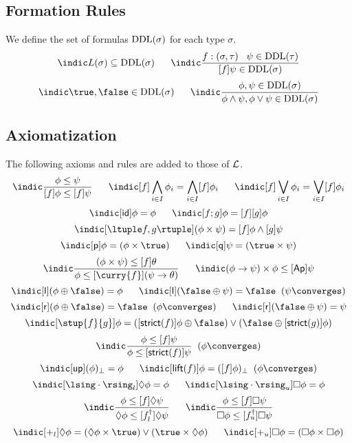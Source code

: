 \subsection*{Formation Rules}
We define the set of formulas ${\rm DDL}(\sigma )$ for each type $\sigma$.
\[ \indic L(\sigma ) \subseteq {\rm DDL}(\sigma ) \;\;\;\;\;\;
\indic \frac{f : (\sigma , \tau ) \;\;\; \psi \in {\rm DDL}(\tau )}{[f]\psi \in {\rm DDL}(\sigma )} \]
\[ \indic \true , \false \in {\rm DDL}(\sigma ) \;\;\;\;\;\;
\indic \frac{\phi , \psi \in {\rm DDL}(\sigma )}{\phi \wedge \psi , \phi \vee \psi \in {\rm DDL}(\sigma )} \]
\subsection*{Axiomatization}
The following axioms and rules are added to those of $\cal L$.
\[ \indic \frac{\phi \leq \psi}{[f]\phi \leq [f]\psi} \;\;\;\;\;\;
   \indic [f]\bigwedge_{i \in I} \phi_{i} = \bigwedge_{i \in I} [f] \phi_{i} \;\;\;\;\;\;
   \indic [f]\bigvee_{i \in I} \phi_{i} = \bigvee_{i \in I} [f] \phi_{i} \]
\[ \indic [{\sf id}]\phi = \phi \;\;\;\;\;\; \indic [f ; g] \phi = [f][g]\phi \]
\[ \indic [\ltuple f, g \rtuple ] (\phi \times \psi ) = [f]\phi \wedge [g]\psi \]
\[ \indic [{\sf p}]\phi = (\phi \times \true ) \;\;\;\;\;\;
\indic [{\sf q}]\psi = (\true \times \psi ) \]
\[ \indic \frac{(\phi \times \psi ) \leq [f]\theta}{\phi \leq [\curry{f}](\psi \rightarrow \theta )} \;\;\;\;\;\;
\indic (\phi \rightarrow \psi ) \times \phi \leq [{\sf Ap}]\psi \]
\[ \indic [{\sf l}](\phi \oplus \false ) = \phi \;\;\;\;\;\;
\indic [{\sf l}](\false \oplus \psi ) = \false \;\; (\psi \converges ) \]
\[ \indic [{\sf r}](\phi \oplus \false ) = \false \;\; (\phi \converges ) \;\;\;\;\;\;
\indic [{\sf r}](\false \oplus \psi ) = \psi \]
\[ \indic [\stup{f}{g}]\phi = ([{\sf strict}(f)]\phi \oplus \false ) \vee (\false \oplus [{\sf strict}(g)]\phi ) \]
\[ \indic \frac{\phi \leq [f]\psi}{\phi \leq [{\sf strict}(f)]\psi} \;\; (\phi \converges ) \]
\[ \indic [{\sf up}](\phi )_{\bot} = \phi \;\;\;\;\;\;
\indic [{\sf lift}(f)]\phi = ([f]\phi )_{\bot} \;\; (\phi \converges ) \]
\[ \indic [\lsing \cdot \rsing_{l}] \Diamond \phi = \phi \;\;\;\;\;\;
\indic [\lsing \cdot \rsing_{u}] \Box \phi = \phi \]
\[ \indic \frac{\phi \leq [f]\Diamond \psi}{\Diamond \phi \leq [f^{\dagger}_{l}]\Diamond \psi} \;\;\;\;\;\;
\indic \frac{\phi \leq [f]\Box \psi}{\Box \phi \leq [f^{\dagger}_{u}]\Box \psi} \]
\[ \indic [+_{l}]\Diamond \phi = (\Diamond \phi \times \true ) \vee (\true \times \Diamond \phi ) \;\;\;\;\;\;
\indic [+_{u}]\Box \phi = (\Box \phi \times \Box \phi )  \]
